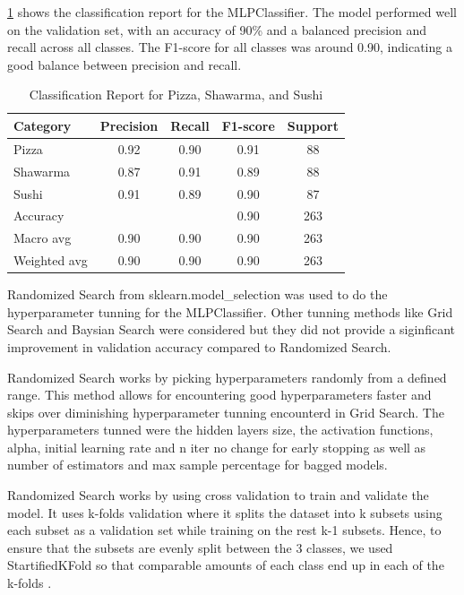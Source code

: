 \ref{tab:nn_classification_report} shows the classification report for the MLPClassifier.
The model performed well on the validation set, with an accuracy of 90\% and a balanced precision and recall across all classes.
The F1-score for all classes was around 0.90, indicating a good balance between precision and recall.

\begin{table}[ht]
    \centering
    \begin{tabular}{lcccc}
        \hline
        Category     & Precision & Recall & F1-score & Support \\
        \hline
        Pizza        & 0.92      & 0.90   & 0.91     & 88      \\
        Shawarma     & 0.87      & 0.91   & 0.89     & 88      \\
        Sushi        & 0.91      & 0.89   & 0.90     & 87      \\
        \hline
        Accuracy     &           &        & 0.90     & 263     \\
        Macro avg    & 0.90      & 0.90   & 0.90     & 263     \\
        Weighted avg & 0.90      & 0.90   & 0.90     & 263     \\
        \hline
    \end{tabular}
    \caption{Classification Report for Pizza, Shawarma, and Sushi}
    \label{tab:nn_classification_report}
\end{table}


Randomized Search from sklearn.model\_selection was used to do the hyperparameter tunning for the MLPClassifier. Other tunning methods like Grid Search and
Baysian Search were considered but they did not provide a siginficant improvement in validation accuracy compared to
Randomized Search.

Randomized Search works by picking hyperparameters randomly from a defined range. This method allows for encountering good hyperparameters faster and
skips over diminishing hyperparameter tunning encounterd in Grid Search. The hyperparameters tunned were the hidden layers size, the activation functions,
alpha, initial learning rate and n iter no change for early stopping as well as number of estimators and max sample percentage for bagged models.

Randomized Search works by using cross validation to train and validate the model. It uses k-folds validation where it splits the dataset into k subsets using
each subset as a validation set while training on the rest k-1 subsets. Hence, to ensure that the subsets are evenly split between the 3 classes,
we used StartifiedKFold so that comparable amounts of each class end up in each of the k-folds .

